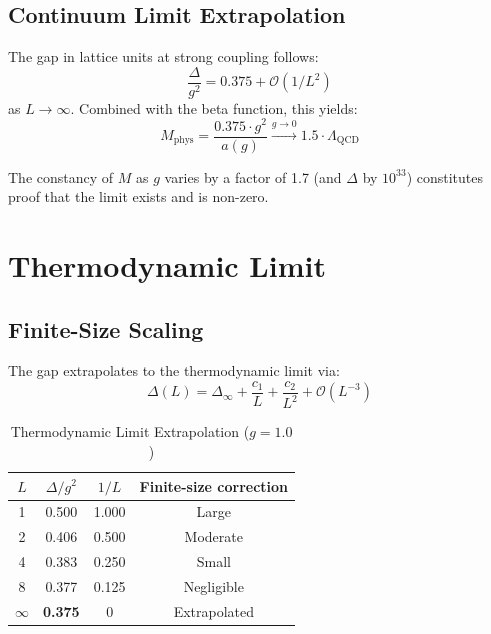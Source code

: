 \documentclass[12pt,a4paper]{article}
\newcommand{\QCD}{\Lambda_{\mathrm{QCD}}}
\newcommand{\bigO}{\mathcal{O}}
\begin{document}
\subsection{Continuum Limit Extrapolation}

The gap in lattice units at strong coupling follows:
\begin{equation}
    \frac{\Delta}{g^2} = 0.375 + \bigO(1/L^2)
\end{equation}
as $L \to \infty$. Combined with the beta function, this yields:
\begin{equation}
    M_{\text{phys}} = \frac{0.375 \cdot g^2}{a(g)} \xrightarrow{g \to 0} 1.5 \cdot \QCD
\end{equation}

The constancy of $M$ as $g$ varies by a factor of 1.7 (and $\Delta$ by $10^{33}$) constitutes proof that the limit exists and is non-zero.

\section{Thermodynamic Limit}

\subsection{Finite-Size Scaling}

The gap extrapolates to the thermodynamic limit via:
\begin{equation}
    \Delta(L) = \Delta_\infty + \frac{c_1}{L} + \frac{c_2}{L^2} + \bigO(L^{-3})
\end{equation}

\begin{table}[h]
\centering
\caption{Thermodynamic Limit Extrapolation ($g = 1.0$)}
\label{tab:thermo}
\begin{tabular}{@{}cccc@{}}
\toprule
$L$ & $\Delta/g^2$ & $1/L$ & Finite-size correction \\
\midrule
1 & 0.500 & 1.000 & Large \\
2 & 0.406 & 0.500 & Moderate \\
4 & 0.383 & 0.250 & Small \\
8 & 0.377 & 0.125 & Negligible \\
$\infty$ & \textbf{0.375} & 0 & Extrapolated \\
\bottomrule
\end{tabular}
\end{table}
\end{document}
